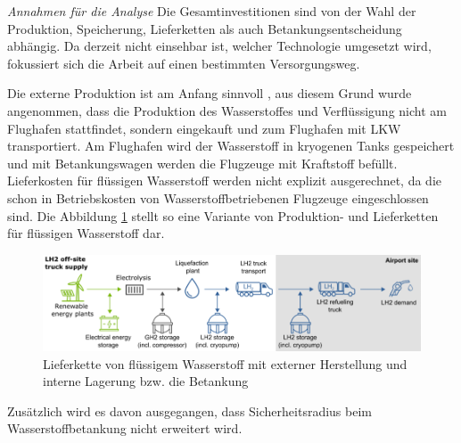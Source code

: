 \textit{Annahmen für die Analyse}
Die Gesamtinvestitionen sind von der Wahl der Produktion, Speicherung, Lieferketten als auch Betankungsentscheidung abhängig.
Da derzeit nicht einsehbar ist, welcher Technologie umgesetzt wird, fokussiert sich die Arbeit auf einen bestimmten Versorgungsweg.

Die externe Produktion ist am Anfang sinnvoll \cite{colpan2022fuel}, aus diesem Grund wurde angenommen, dass die Produktion 
des Wasserstoffes und Verflüssigung nicht am Flughafen stattfindet, sondern eingekauft und zum Flughafen mit LKW transportiert.
Am Flughafen wird der Wasserstoff in kryogenen Tanks gespeichert und mit Betankungswagen werden die Flugzeuge mit Kraftstoff befüllt.
%
Lieferkosten für flüssigen Wasserstoff  werden nicht explizit ausgerechnet,
da die schon in Betriebskosten von Wasserstoffbetriebenen Flugzeuge eingeschlossen sind.
%
Die Abbildung \ref{supply_wasserstoff} stellt so eine Variante von Produktion- und Lieferketten für flüssigen Wasserstoff dar.
\begin{figure}[h]
	\centering
	\includegraphics[width=0.9\linewidth]{Bilder/Supply_hydrogen.png}
	\caption[Lieferkette von flüssigem Wasserstoff mit externer Herstellung und interner Lagerung bzw. die Betankung]{Lieferkette von flüssigem Wasserstoff mit externer Herstellung und interne Lagerung bzw. die Betankung \cite{schenke2024lh2}}
	\label{supply_wasserstoff}
\end{figure}

Zusätzlich wird es davon ausgegangen, dass Sicherheitsradius beim Wasserstoffbetankung nicht erweitert wird.
